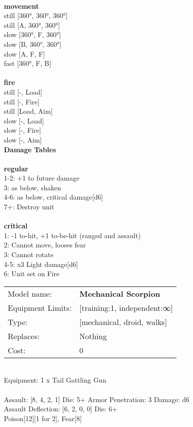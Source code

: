 \noindent 

\ \\ {\bf movement } \\
still [360°, 360°, 360°] \\
still [A, 360°, 360°] \\
slow [360°, F, 360°] \\
slow [B, 360°, 360°] \\
slow [A, F, F] \\
fast [360°, F, B] \\
\ \\ {\bf fire } \\
still [-, Load] \\
still [-, Fire] \\
still [Load, Aim] \\
slow [-, Load] \\
slow [-, Fire] \\
slow [-, Aim] \\


{\bf Damage Tables} \\
\ \\ {\bf regular } \\
1-2: +1 to future damage \\
3: as below, shaken \\
4-6: as below, critical damage[d6] \\
7+: Destroy unit \\
\ \\ {\bf critical } \\
1: -1 to-hit, +1 to-be-hit (ranged and assault) \\
2: Cannot move, looses fear \\
3: Cannot rotate \\
4-5: x3 Light damage[d6] \\
6: Unit set on Fire \\


\noindent
\begin{tabular}{ll}
Model name: &{\bf Mechanical Scorpion } \\
Equipment Limits: &[training:1, independent:∞] \\
Type: &[mechanical, droid, walks] \\
Replaces: &Nothing \\
Cost: & 0\\
\end{tabular}
\ \\
Equipment: 1 x Tail Gattling Gun \\
\ \\
Assault: [8, 4, 2, 1] Die: 5+ Armor Penetration: 3 Damage: d6 \\
Assault Deflection: [6, 2, 0, 0] Die: 6+\\
\indent Poison[12][1 for 2], Fear[8]\\ 
 
